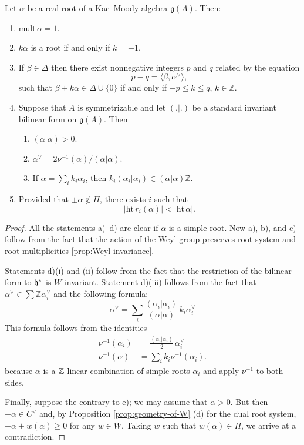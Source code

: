 \documentclass[12pt]{article}
\begin{document}
\begin{proposition}\label{prop:real-roots}
Let $\alpha$ be a real root of a Kac--Moody algebra $\mathfrak{g}(A)$. Then:
\begin{enumerate}[label=\alph*)]
    \item $\mathrm{mult}\,\alpha = 1$.
    \item $k\alpha$ is a root if and only if $k = \pm 1$.
    \item If $\beta \in \Delta$ then there exist nonnegative integers $p$ and $q$ related by the equation
    \[
        p - q = \langle \beta, \alpha^\vee \rangle,
    \]
    such that $\beta + k\alpha \in \Delta \cup \{0\}$ if and only if $-p \leq k \leq q$, $k \in \mathbb{Z}$.
    \item Suppose that $A$ is symmetrizable and let $(.|.)$ be a standard invariant bilinear form on $\mathfrak{g}(A)$. Then
    \begin{enumerate}[label=(\roman*)]
        \item $(\alpha|\alpha) > 0$.
        \item $\alpha^\vee = 2\nu^{-1}(\alpha)/(\alpha|\alpha)$.
        \item If $\alpha = \sum_i k_i \alpha_i$, then $k_i(\alpha_i|\alpha_i) \in (\alpha|\alpha)\mathbb{Z}$.
    \end{enumerate}
    \item Provided that $\pm \alpha \notin \Pi$, there exists $i$ such that
    \[
        |\mathrm{ht}\, r_i(\alpha)| < |\mathrm{ht}\,\alpha|.
    \]
\end{enumerate}
\end{proposition}

\begin{proof}
All the statements a)--d) are clear if $\alpha$ is a simple root. Now a), b), and c) follow from the fact that the action of the Weyl group preserves root system and root multiplicities \ref{prop:Weyl-invariance}.

Statements d)(i) and (ii) follow from the fact that the restriction of the bilinear form to $\mathfrak{h}^*$ is $W$-invariant. Statement d)(iii) follows from the fact that $\alpha^\vee \in \sum \mathbb{Z}\alpha_i^\vee$ and the following formula:
\[
    \alpha^\vee = \sum_i \frac{(\alpha_i|\alpha_i)}{(\alpha|\alpha)}\, k_i \alpha_i^\vee
\] This formula follows from the identities \begin{align*}
    \nu^{-1}(\alpha_i) &= \frac{(\alpha_i|\alpha_i)}{2} \, \alpha_i^\vee \\
    \nu^{-1}(\alpha) &= \sum_i k_i \nu^{-1}(\alpha_i).
\end{align*} because $\alpha$ is a $\mathbb{Z}$-linear combination of simple roots $\alpha_i$ and apply $\nu^{-1}$ to both sides.

Finally, suppose the contrary to e); we may assume that $\alpha > 0$. But then $-\alpha \in C^\vee$ and, by Proposition \ref{prop:geometry-of-W} (d) for the dual root system, $-\alpha + w(\alpha) \geq 0$ for any $w \in W$. Taking $w$ such that $w(\alpha) \in \Pi$, we arrive at a contradiction.
\end{proof}
\end{document}
